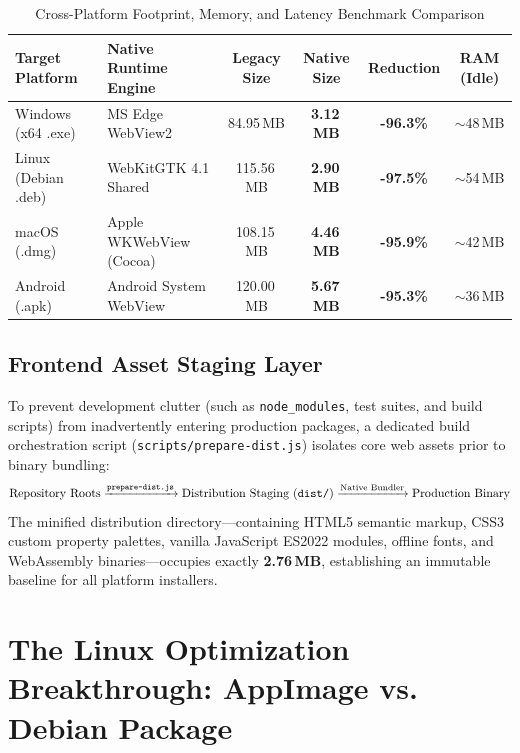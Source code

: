\documentclass[11pt,a4paper]{article}
\begin{document}
\begin{table}[htbp]
\centering
\caption{Cross-Platform Footprint, Memory, and Latency Benchmark Comparison}
\label{tab:comparison}
\vspace{0.5em}
\small
\begin{tabularx}{\textwidth}{lXcccc}
\toprule
\textbf{Target Platform} & \textbf{Native Runtime Engine} & \textbf{Legacy Size} & \textbf{Native Size} & \textbf{Reduction} & \textbf{RAM (Idle)} \\
\midrule
Windows (x64 .exe) & MS Edge WebView2 \cite{webview2023} & 84.95\,MB & \textbf{3.12\,MB} & \textbf{-96.3\%} & $\sim$48\,MB \\
Linux (Debian .deb) & WebKitGTK 4.1 Shared \cite{tauri2024} & 115.56\,MB & \textbf{2.90\,MB} & \textbf{-97.5\%} & $\sim$54\,MB \\
macOS (.dmg) & Apple WKWebView (Cocoa) \cite{tauri2024} & 108.15\,MB & \textbf{4.46\,MB} & \textbf{-95.9\%} & $\sim$42\,MB \\
Android (.apk) & Android System WebView \cite{capacitor2023} & 120.00\,MB & \textbf{5.67\,MB} & \textbf{-95.3\%} & $\sim$36\,MB \\
\bottomrule
\end{tabularx}
\end{table}

\subsection{Frontend Asset Staging Layer}
To prevent development clutter (such as \texttt{node\_modules}, test suites, and build scripts) from inadvertently entering production packages, a dedicated build orchestration script (\texttt{scripts/prepare-dist.js}) isolates core web assets prior to binary bundling:
\begin{equation}
    \text{Repository Roots} \xrightarrow{\texttt{prepare-dist.js}} \text{Distribution Staging (\texttt{dist/})} \xrightarrow{\text{Native Bundler}} \text{Production Binary}
\end{equation}
The minified distribution directory---containing HTML5 semantic markup, CSS3 custom property palettes, vanilla JavaScript ES2022 modules, offline fonts, and WebAssembly binaries---occupies exactly \textbf{2.76\,MB}, establishing an immutable baseline for all platform installers.

\section{The Linux Optimization Breakthrough: AppImage vs. Debian Package}
\label{sec:linux_opt}
\end{document}
